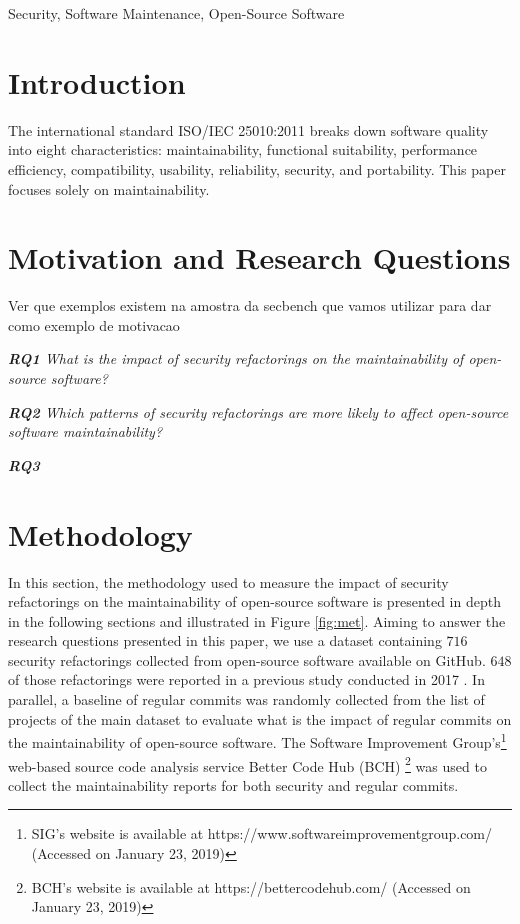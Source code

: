 \documentclass[10pt,conference]{IEEEtran}
\begin{document}
\begin{IEEEkeywords}
Security, Software Maintenance, Open-Source Software
\end{IEEEkeywords}

\section{Introduction}



The international standard ISO/IEC 25010:2011 breaks down software quality into eight characteristics: maintainability,
functional suitability, performance efficiency, compatibility, usability, reliability, security,
and portability. This paper focuses solely on maintainability.



\section{Motivation and Research Questions}

\textcolor{mypink3}{Ver que exemplos existem na amostra da secbench que vamos utilizar para dar como exemplo de motivacao}

\begin{framed}
\textit{\textbf{RQ1} What is the impact of security refactorings on the maintainability of open-source software?}
\end{framed}

\begin{framed}
\textit{\textbf{RQ2} Which patterns of security refactorings are more likely to affect open-source software maintainability?}
\end{framed}

\begin{framed}
\textit{\textbf{RQ3} }
\end{framed}


\section{Methodology}

In this section, the methodology used to measure the impact of security refactorings on the maintainability of open-source software is presented in depth in the following sections and illustrated in Figure \ref{fig:met}. Aiming to answer the research questions presented in this paper, we use a dataset containing $716$ security refactorings collected from open-source software available on GitHub. $648$ of those refactorings were reported in a previous study conducted in 2017 \cite{Reis:2017:IJSSE}. In parallel, a baseline of regular commits was randomly collected from the list of projects of the main dataset to evaluate what is the impact of regular commits on the maintainability of open-source software. The Software Improvement Group's\footnote{SIG's website is available at https://www.softwareimprovementgroup.com/ (Accessed on January 23, 2019)} web-based source code analysis service Better Code Hub (BCH) \footnote{BCH's website is available at https://bettercodehub.com/ (Accessed on January 23, 2019)} was used to collect the maintainability reports for both security and regular commits.
\end{document}
